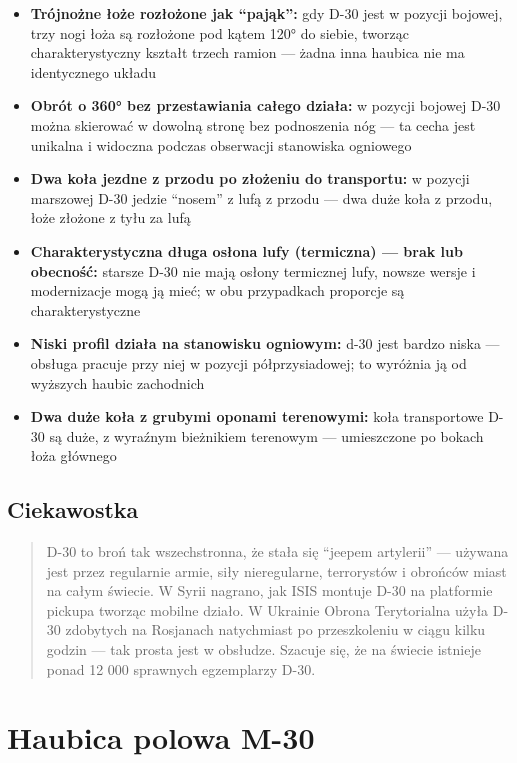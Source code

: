 \documentclass[12pt,openany,oneside]{book}
\providecommand{\tightlist}{%
  \setlength{\itemsep}{0pt}\setlength{\parskip}{0pt}}
\begin{document}
\begin{itemize}
\tightlist
\item
  \textbf{Trójnożne łoże rozłożone jak ``pająk'':} gdy D-30 jest w
  pozycji bojowej, trzy nogi łoża są rozłożone pod kątem 120° do siebie,
  tworząc charakterystyczny kształt trzech ramion --- żadna inna haubica
  nie ma identycznego układu
\item
  \textbf{Obrót o 360° bez przestawiania całego działa:} w pozycji
  bojowej D-30 można skierować w dowolną stronę bez podnoszenia nóg ---
  ta cecha jest unikalna i widoczna podczas obserwacji stanowiska
  ogniowego
\item
  \textbf{Dwa koła jezdne z przodu po złożeniu do transportu:} w pozycji
  marszowej D-30 jedzie ``nosem'' z lufą z przodu --- dwa duże koła z
  przodu, łoże złożone z tyłu za lufą
\item
  \textbf{Charakterystyczna długa osłona lufy (termiczna) --- brak lub
  obecność:} starsze D-30 nie mają osłony termicznej lufy, nowsze wersje
  i modernizacje mogą ją mieć; w obu przypadkach proporcje są
  charakterystyczne
\item
  \textbf{Niski profil działa na stanowisku ogniowym:} d-30 jest bardzo
  niska --- obsługa pracuje przy niej w pozycji półprzysiadowej; to
  wyróżnia ją od wyższych haubic zachodnich
\item
  \textbf{Dwa duże koła z grubymi oponami terenowymi:} koła transportowe
  D-30 są duże, z wyraźnym bieżnikiem terenowym --- umieszczone po
  bokach łoża głównego
\end{itemize}

\section{Ciekawostka}\label{ciekawostka-16}

\begin{quote}
D-30 to broń tak wszechstronna, że stała się ``jeepem artylerii'' ---
używana jest przez regularnie armie, siły nieregularne, terrorystów i
obrońców miast na całym świecie. W Syrii nagrano, jak ISIS montuje D-30
na platformie pickupa tworząc mobilne działo. W Ukrainie Obrona
Terytorialna użyła D-30 zdobytych na Rosjanach natychmiast po
przeszkoleniu w ciągu kilku godzin --- tak prosta jest w obsłudze.
Szacuje się, że na świecie istnieje ponad 12 000 sprawnych egzemplarzy
D-30.
\end{quote}

\chapter{Haubica polowa M-30}\label{haubica-polowa-m-30}
\end{document}

